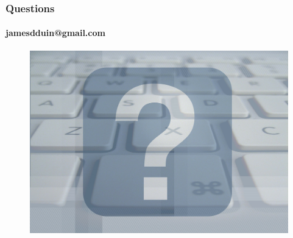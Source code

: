 \documentclass{beamer}
\begin{document}
\begin{frame}
    \frametitle{Questions}  %
    \framesubtitle{jamesdduin@gmail.com}
    \begin{figure}[!htb]
        \centering
        \includegraphics[width=1.0\columnwidth]{fig/question}
        \label{fig:question}
    \end{figure}
\end{frame}
\end{document}
